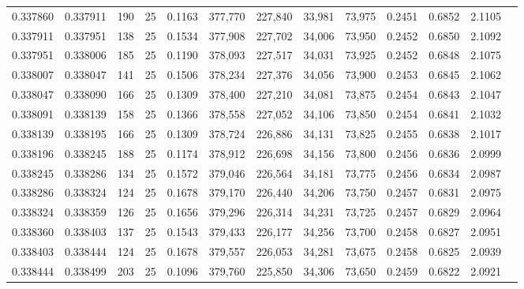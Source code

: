 \begin{tabular}{rrrrrrrrrrrrr}
0.337860 & 0.337911 &   190 &  25 &                                     0.1163 & 377,770 & 227,840 &  33,981 &  73,975 & 0.2451 & 0.6852 & 2.1105 \\
0.337911 & 0.337951 &   138 &  25 &                                     0.1534 & 377,908 & 227,702 &  34,006 &  73,950 & 0.2452 & 0.6850 & 2.1092 \\
0.337951 & 0.338006 &   185 &  25 &                                     0.1190 & 378,093 & 227,517 &  34,031 &  73,925 & 0.2452 & 0.6848 & 2.1075 \\
0.338007 & 0.338047 &   141 &  25 &                                     0.1506 & 378,234 & 227,376 &  34,056 &  73,900 & 0.2453 & 0.6845 & 2.1062 \\
0.338047 & 0.338090 &   166 &  25 &                                     0.1309 & 378,400 & 227,210 &  34,081 &  73,875 & 0.2454 & 0.6843 & 2.1047 \\
0.338091 & 0.338139 &   158 &  25 &                                     0.1366 & 378,558 & 227,052 &  34,106 &  73,850 & 0.2454 & 0.6841 & 2.1032 \\
0.338139 & 0.338195 &   166 &  25 &                                     0.1309 & 378,724 & 226,886 &  34,131 &  73,825 & 0.2455 & 0.6838 & 2.1017 \\
0.338196 & 0.338245 &   188 &  25 &                                     0.1174 & 378,912 & 226,698 &  34,156 &  73,800 & 0.2456 & 0.6836 & 2.0999 \\
0.338245 & 0.338286 &   134 &  25 &                                     0.1572 & 379,046 & 226,564 &  34,181 &  73,775 & 0.2456 & 0.6834 & 2.0987 \\
0.338286 & 0.338324 &   124 &  25 &                                     0.1678 & 379,170 & 226,440 &  34,206 &  73,750 & 0.2457 & 0.6831 & 2.0975 \\
0.338324 & 0.338359 &   126 &  25 &                                     0.1656 & 379,296 & 226,314 &  34,231 &  73,725 & 0.2457 & 0.6829 & 2.0964 \\
0.338360 & 0.338403 &   137 &  25 &                                     0.1543 & 379,433 & 226,177 &  34,256 &  73,700 & 0.2458 & 0.6827 & 2.0951 \\
0.338403 & 0.338444 &   124 &  25 &                                     0.1678 & 379,557 & 226,053 &  34,281 &  73,675 & 0.2458 & 0.6825 & 2.0939 \\
0.338444 & 0.338499 &   203 &  25 &                                     0.1096 & 379,760 & 225,850 &  34,306 &  73,650 & 0.2459 & 0.6822 & 2.0921 \\

\end{tabular}
